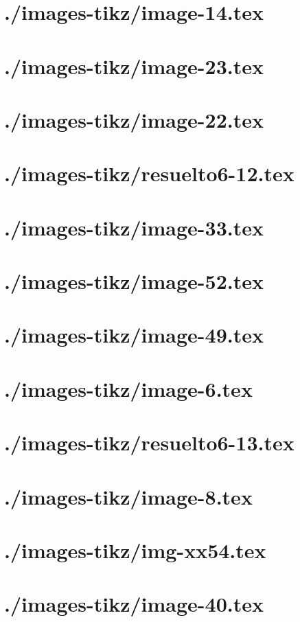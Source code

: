 \documentclass[]{article}
\begin{document}
\section{./images-tikz/image-14.tex} 
\section{./images-tikz/image-23.tex} 
\section{./images-tikz/image-22.tex} 
\section{./images-tikz/resuelto6-12.tex} 
\section{./images-tikz/image-33.tex} 
\section{./images-tikz/image-52.tex} 
\section{./images-tikz/image-49.tex} 
\section{./images-tikz/image-6.tex} 
\section{./images-tikz/resuelto6-13.tex} 
\section{./images-tikz/image-8.tex} 
\section{./images-tikz/img-xx54.tex} 
\section{./images-tikz/image-40.tex} 
\end{document}
